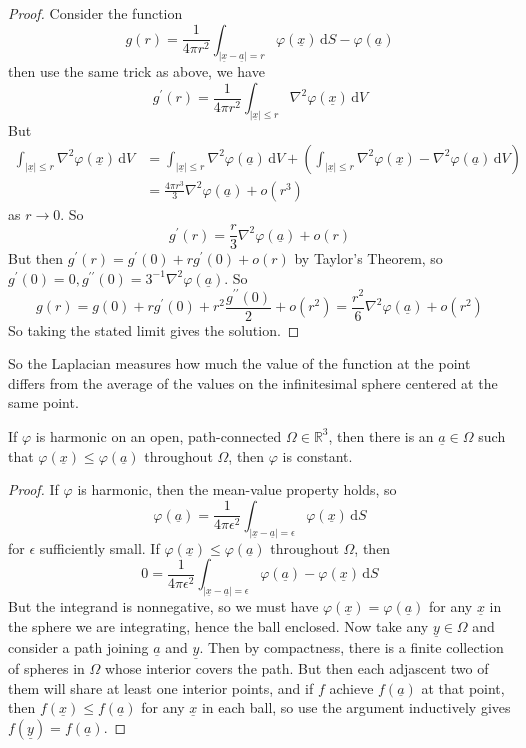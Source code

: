 \begin{proof}
    Consider the function
    $$g(r)=\frac{1}{4\pi r^2}\int_{|\underline{x}-\underline{a}|=r}\varphi(\underline{x})\,\mathrm dS-\varphi(\underline{a})$$
    then use the same trick as above, we have
    $$g^\prime(r)=\frac{1}{4\pi r^2}\int_{|\underline{x}|\le r}\nabla^2\varphi(\underline{x})\,\mathrm dV$$
    But
    \begin{align*}
        \int_{|\underline{x}|\le r}\nabla^2\varphi(\underline{x})\,\mathrm dV&=\int_{|\underline{x}|\le r}\nabla^2\varphi(\underline{a})\,\mathrm dV+\left( \int_{|\underline{x}|\le r}\nabla^2\varphi(\underline{x})-\nabla^2\varphi(\underline{a})\,\mathrm dV \right)\\
        &=\frac{4\pi r^3}{3}\nabla^2\varphi(\underline{a})+o(r^3)
    \end{align*}
    as $r\to 0$.
    So
    $$g^\prime(r)=\frac{r}{3}\nabla^2\varphi(\underline{a})+o(r)$$
    But then $g^\prime(r)=g^\prime(0)+rg^\prime(0)+o(r)$ by Taylor's Theorem, so $g^\prime(0)=0,g^{\prime\prime}(0)=3^{-1}\nabla^2\varphi(\underline{a})$.
    So
    $$g(r)=g(0)+rg^\prime(0)+r^2\frac{g^{\prime\prime}(0)}{2}+o(r^2)=\frac{r^2}{6}\nabla^2\varphi(\underline{a})+o(r^2)$$
    So taking the stated limit gives the solution.
\end{proof}
So the Laplacian measures how much the value of the function at the point differs from the average of the values on the infinitesimal sphere centered at the same point.
\begin{proposition}
    If $\varphi$ is harmonic on an open, path-connected $\Omega\in\mathbb R^3$, then there is an $\underline{a}\in\Omega$ such that $\varphi(\underline{x})\le\varphi(\underline{a})$ throughout $\Omega$, then $\varphi$ is constant.
\end{proposition}
\begin{proof}
    If $\varphi$ is harmonic, then the mean-value property holds, so
    $$\varphi(\underline{a})=\frac{1}{4\pi\epsilon^2}\int_{|\underline{x}-\underline{a}|=\epsilon}\varphi(\underline{x})\,\mathrm dS$$
    for $\epsilon$ sufficiently small.
    If $\varphi(\underline{x})\le\varphi(\underline{a})$ throughout $\Omega$, then
    $$0=\frac{1}{4\pi\epsilon^2}\int_{|\underline{x}-\underline{a}|=\epsilon}\varphi(\underline{a})-\varphi(\underline{x})\,\mathrm dS$$
    But the integrand is nonnegative, so we must have $\varphi(\underline{x})=\varphi(\underline{a})$ for any $\underline{x}$ in the sphere we are integrating, hence the ball enclosed.
    Now take any $\underline{y}\in\Omega$ and consider a path joining $\underline{a}$ and $\underline{y}$.
    Then by compactness, there is a finite collection of spheres in $\Omega$ whose interior covers the path.
    But then each adjascent two of them will share at least one interior points, and if $f$ achieve $f(\underline{a})$ at that point, then $f(\underline{x})\le f(\underline{a})$ for any $\underline{x}$ in each ball, so use the argument inductively gives $f(\underline{y})=f(\underline{a})$.
\end{proof}
